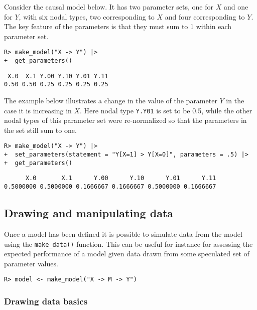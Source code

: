 \documentclass[
  11pt,
  article]{jss}
\begin{document}
Consider the causal model below. It has two parameter sets, one for
\(X\) and one for \(Y\), with six nodal types, two corresponding to
\(X\) and four corresponding to \(Y\). The key feature of the parameters
is that they must sum to 1 within each parameter set.

\begin{verbatim}
R> make_model("X -> Y") |> 
+  get_parameters()
\end{verbatim}

\begin{verbatim}
 X.0  X.1 Y.00 Y.10 Y.01 Y.11 
0.50 0.50 0.25 0.25 0.25 0.25 
\end{verbatim}

The example below illustrates a change in the value of the parameter
\(Y\) in the case it is increasing in \(X\). Here nodal type
\texttt{Y.Y01} is set to be 0.5, while the other nodal types of this
parameter set were re-normalized so that the parameters in the set still
sum to one.

\begin{verbatim}
R> make_model("X -> Y") |>
+  set_parameters(statement = "Y[X=1] > Y[X=0]", parameters = .5) |>
+  get_parameters()
\end{verbatim}

\begin{verbatim}
      X.0       X.1      Y.00      Y.10      Y.01      Y.11 
0.5000000 0.5000000 0.1666667 0.1666667 0.5000000 0.1666667 
\end{verbatim}

\hypertarget{drawing-and-manipulating-data}{%
\subsection{Drawing and manipulating
data}\label{drawing-and-manipulating-data}}

Once a model has been defined it is possible to simulate data from the
model using the \texttt{make\_data()} function. This can be useful for
instance for assessing the expected performance of a model given data
drawn from some speculated set of parameter values.

\begin{verbatim}
R> model <- make_model("X -> M -> Y") 
\end{verbatim}

\hypertarget{drawing-data-basics}{%
\subsubsection{Drawing data basics}\label{drawing-data-basics}}
\end{document}
